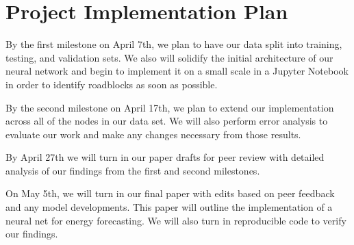 \documentclass[sigconf]{acmart}
\begin{document}
\section{Project Implementation Plan}
By the first milestone on April 7th, we plan to have our data split into training, testing, and validation sets. We also will solidify the initial architecture of our neural network and begin to implement it on a small scale in a Jupyter Notebook in order to identify roadblocks as soon as possible. 

By the second milestone on April 17th, we plan to extend our implementation across all of the nodes in our data set. We will also perform error analysis to evaluate our work and make any changes necessary from those results. 

By April 27th we will turn in our paper drafts for peer review with detailed analysis of our findings from the first and second milestones.

On May 5th, we will turn in our final paper with edits based on peer feedback and any model developments. This paper will outline the implementation of a neural net for energy forecasting. We will also turn in reproducible code to verify our findings. 


%	
%



%

\end{document}
